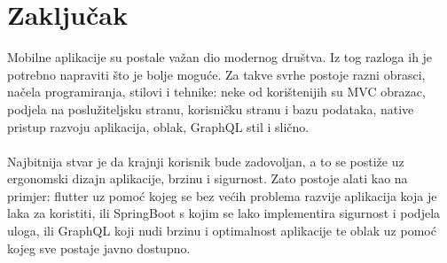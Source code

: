 \documentclass[times, utf8, zavrsni]{fer}
\begin{document}
\chapter{Zaključak}
Mobilne aplikacije su postale važan dio modernog društva. Iz tog razloga ih je potrebno napraviti što je
bolje moguće. Za takve svrhe postoje razni obrasci, načela programiranja, stilovi i tehnike: neke od
korištenijih su MVC obrazac, podjela na poslužiteljsku stranu, korisničku stranu i bazu podataka,
native pristup razvoju aplikacija, oblak, GraphQL stil i slično.
\\\\
Najbitnija stvar je da krajnji korisnik bude zadovoljan, a to se postiže uz ergonomski dizajn aplikacije,
brzinu i sigurnost. Zato postoje alati kao na primjer: flutter uz pomoć kojeg se bez većih problema razvije aplikacija koja
je laka za koristiti, ili SpringBoot s kojim se lako implementira sigurnost i podjela uloga, ili GraphQL koji
nudi brzinu i optimalnost aplikacije te oblak uz pomoć kojeg sve postaje javno dostupno.



\end{document}

